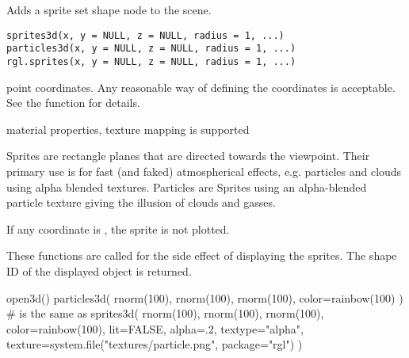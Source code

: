 \begin{Description}\relax
Adds a sprite set shape node to the scene.
\end{Description}
\begin{Usage}
\begin{verbatim}
sprites3d(x, y = NULL, z = NULL, radius = 1, ...)
particles3d(x, y = NULL, z = NULL, radius = 1, ...)
rgl.sprites(x, y = NULL, z = NULL, radius = 1, ...)
\end{verbatim}
\end{Usage}
\begin{Arguments}
\begin{ldescription}
\item[\code{ x, y, z }] point coordinates.  Any reasonable way of defining the
coordinates is acceptable.  See the function 
for details.
\item[\code{ radius }] 
\item[\code{ ... }] material properties, texture mapping is supported
\end{ldescription}
\end{Arguments}
\begin{Details}\relax
Sprites are rectangle planes that are directed towards the viewpoint.
Their primary use is for fast (and faked) atmospherical effects, e.g. particles and clouds
using alpha blended textures.
Particles are Sprites using an alpha-blended particle texture giving
the illusion of clouds and gasses.

If any coordinate is , the sprite is not plotted.
\end{Details}
\begin{Value}
These functions are called for the side effect of displaying the sprites.
The shape ID of the displayed object is returned.
\end{Value}
\begin{SeeAlso}\relax
{}
\end{SeeAlso}
\begin{Examples}
\begin{ExampleCode}
open3d()
particles3d( rnorm(100), rnorm(100), rnorm(100), color=rainbow(100) )
# is the same as
sprites3d( rnorm(100), rnorm(100), rnorm(100), color=rainbow(100),
  lit=FALSE, alpha=.2,
  textype="alpha", texture=system.file("textures/particle.png", package="rgl") )
\end{ExampleCode}
\end{Examples}

